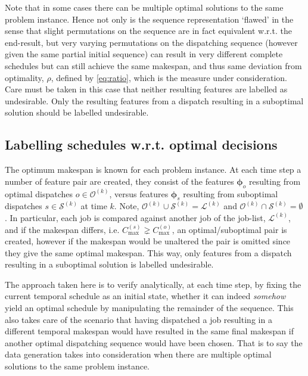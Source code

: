 \documentclass[smallextended]{svjour3}
\renewcommand{\vphi}{\bm \phi}
\begin{document}
Note that in some cases there can be multiple optimal solutions to the
same problem instance. Hence not only is the sequence representation
`flawed' in the sense that slight permutations on the sequence are in
fact equivalent w.r.t. the end-result, but very varying permutations
on the dispatching sequence (however given the same partial initial
sequence) can result in very different complete schedules but can
still achieve the same makespan, and thus same deviation from
optimality, $\rho$, defined by \eqref{eq:ratio}, which is the measure
under consideration. Care must be taken in this case that neither
resulting features are labelled as undesirable. Only the resulting
features from a dispatch resulting in a suboptimal solution should be
labelled undesirable.
	
	\subsection{Labelling schedules w.r.t. optimal decisions}
	The optimum makespan is known for each problem instance. 
	At each time step a number of feature pair are created, they consist of the features $\vphi_o$ resulting from optimal dispatches $o\in\mathcal{O}^{(k)}$, versus features $\vphi_s$ resulting from suboptimal dispatches $s\in\mathcal{S}^{(k)}$ at time $k$. Note, $\mathcal{O}^{(k)}\cup\mathcal{S}^{(k)}=\mathcal{L}^{(k)}$ and $\mathcal{O}^{(k)}\cap\mathcal{S}^{(k)}=\emptyset$.
	In particular, each job is compared against another job of the job-list, $\mathcal{L}^{(k)}$, and if the makespan differs, i.e. $C_{\max}^{(s)}\gneq C_{\max}^{(o)}$, an optimal/suboptimal pair is created, however if the makespan would be unaltered the pair is omitted since they give the same optimal makespan. This way, only features from a dispatch resulting in a suboptimal solution is labelled undesirable.
	
	The approach taken here is to verify analytically, at each time step, by fixing the current temporal schedule as an initial state, whether it can indeed \emph{somehow} yield an optimal schedule by manipulating the remainder of the sequence. This also takes care of the scenario that having dispatched a job resulting in a different temporal makespan would have resulted in the same final makespan if another optimal dispatching sequence would have been chosen. That is to say the data generation takes into consideration when there are multiple optimal solutions to the same problem instance. 
	
	
	
\end{document}
